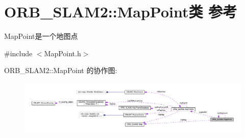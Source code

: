 \hypertarget{classORB__SLAM2_1_1MapPoint}{\section{O\-R\-B\-\_\-\-S\-L\-A\-M2\-:\-:Map\-Point类 参考}
\label{classORB__SLAM2_1_1MapPoint}
}


Map\-Point是一个地图点  




{\ttfamily \#include $<$Map\-Point.\-h$>$}



O\-R\-B\-\_\-\-S\-L\-A\-M2\-:\-:Map\-Point 的协作图\-:
\nopagebreak
\begin{figure}[H]
\begin{center}
\leavevmode
\includegraphics[width=350pt]{classORB__SLAM2_1_1MapPoint__coll__graph}
\end{center}
\end{figure}

